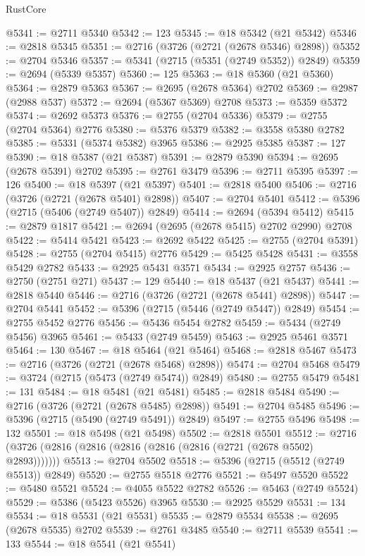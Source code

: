 \begin{lexlean}{RustCore}
\begin{coremodule}
@5341 := @2711 @5340
@5342 := 123
@5345 := @18 @5342 (@21 @5342)
@5346 := @2818 @5345
@5351 := @2716 (@3726 (@2721 (@2678 @5346) @2898))
@5352 := @2704 @5346
@5357 := @5341 (@2715 (@5351 (@2749 @5352)) @2849)
@5359 := @2694 (@5339 @5357)
@5360 := 125
@5363 := @18 @5360 (@21 @5360)
@5364 := @2879 @5363
@5367 := @2695 (@2678 @5364) @2702
@5369 := @2987 (@2988 @537)
@5372 := @2694 (@5367 @5369) @2708
@5373 := @5359 @5372
@5374 := @2692 @5373
@5376 := @2755 (@2704 @5336)
@5379 := @2755 (@2704 @5364) @2776
@5380 := @5376 @5379
@5382 := @3558 @5380 @2782
@5385 := @5331 (@5374 @5382) @3965
@5386 := @2925 @5385
@5387 := 127
@5390 := @18 @5387 (@21 @5387)
@5391 := @2879 @5390
@5394 := @2695 (@2678 @5391) @2702
@5395 := @2761 @3479
@5396 := @2711 @5395
@5397 := 126
@5400 := @18 @5397 (@21 @5397)
@5401 := @2818 @5400
@5406 := @2716 (@3726 (@2721 (@2678 @5401) @2898))
@5407 := @2704 @5401
@5412 := @5396 (@2715 (@5406 (@2749 @5407)) @2849)
@5414 := @2694 (@5394 @5412)
@5415 := @2879 @1817
@5421 := @2694 (@2695 (@2678 @5415) @2702 @2990) @2708
@5422 := @5414 @5421
@5423 := @2692 @5422
@5425 := @2755 (@2704 @5391)
@5428 := @2755 (@2704 @5415) @2776
@5429 := @5425 @5428
@5431 := @3558 @5429 @2782
@5433 := @2925 @5431 @3571
@5434 := @2925 @2757
@5436 := @2750 (@2751 @271)
@5437 := 129
@5440 := @18 @5437 (@21 @5437)
@5441 := @2818 @5440
@5446 := @2716 (@3726 (@2721 (@2678 @5441) @2898))
@5447 := @2704 @5441
@5452 := @5396 (@2715 (@5446 (@2749 @5447)) @2849)
@5454 := @2755 @5452 @2776
@5456 := @5436 @5454 @2782
@5459 := @5434 (@2749 @5456) @3965
@5461 := @5433 (@2749 @5459)
@5463 := @2925 @5461 @3571
@5464 := 130
@5467 := @18 @5464 (@21 @5464)
@5468 := @2818 @5467
@5473 := @2716 (@3726 (@2721 (@2678 @5468) @2898))
@5474 := @2704 @5468
@5479 := @3724 (@2715 (@5473 (@2749 @5474)) @2849)
@5480 := @2755 @5479
@5481 := 131
@5484 := @18 @5481 (@21 @5481)
@5485 := @2818 @5484
@5490 := @2716 (@3726 (@2721 (@2678 @5485) @2898))
@5491 := @2704 @5485
@5496 := @5396 (@2715 (@5490 (@2749 @5491)) @2849)
@5497 := @2755 @5496
@5498 := 132
@5501 := @18 @5498 (@21 @5498)
@5502 := @2818 @5501
@5512 := @2716 (@3726 (@2816 (@2816 (@2816 (@2816 (@2816 (@2721 (@2678 @5502) @2893)))))))
@5513 := @2704 @5502
@5518 := @5396 (@2715 (@5512 (@2749 @5513)) @2849)
@5520 := @2755 @5518 @2776
@5521 := @5497 @5520
@5522 := @5480 @5521
@5524 := @4055 @5522 @2782
@5526 := @5463 (@2749 @5524)
@5529 := @5386 (@5423 @5526) @3965
@5530 := @2925 @5529
@5531 := 134
@5534 := @18 @5531 (@21 @5531)
@5535 := @2879 @5534
@5538 := @2695 (@2678 @5535) @2702
@5539 := @2761 @3485
@5540 := @2711 @5539
@5541 := 133
@5544 := @18 @5541 (@21 @5541)

\end{coremodule}
\end{lexlean}
